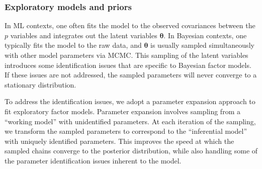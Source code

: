 \subsubsection{Exploratory models and priors}
In ML contexts, one often fits the model to the observed covariances between the $p$ variables and integrates out the latent variables $\bm{\theta}$.  In Bayesian contexts, one typically fits the model to the raw data, and $\bm{\theta}$ is usually sampled simultaneously with other model parameters via MCMC.  This sampling of the latent variables introduces some identification issues that are specific to Bayesian factor models.  If these issues are not addressed, the sampled parameters will never converge to a stationary distribution.

To address the identification issues, we adopt a parameter expansion approach \cite{gel04,gel06,ghodun09} to fit exploratory factor models. Parameter expansion involves sampling from a ``working model'' with unidentified parameters.  At each iteration of the sampling, we transform the sampled parameters to correspond to the ``inferential model'' with uniquely identified parameters. This improves the speed at which the sampled chains converge to the posterior distribution, while also handling some of the parameter identification issues inherent to the model.

